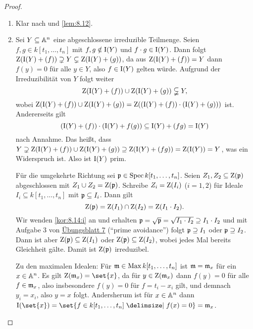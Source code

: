 \documentclass[12pt,a4paper]{scrartcl}
\theoremstyle{cplain}
\theoremstyle{cdef}
\begin{document}
\begin{proof}
	\leavevmode
	\begin{enumerate}[label=\ref{kor:8.14:\roman*}]
		\item Klar nach  und \cref{lem:8.12}.
		\item Sei $Y\subseteq \mathbb A^n$ eine abgeschlossene irreduzible Teilmenge. Seien $f,g\in k[t_1,\dots, t_n]$ mit $f,g\notin \operatorname{I}(Y)$ und $f\cdot g \in \operatorname{I}(Y)$. Dann folgt $\operatorname{Z}(\operatorname{I}(Y)+(f))\supsetneq Y \subsetneq \operatorname{Z}(\operatorname{I}(Y)+(g))$, da aus $\operatorname{Z}(\operatorname{I}(Y)+(f)) = Y$ dann $f(y) = 0$ für alle $y \in Y$, also $f\in \operatorname{I}(Y)$ gelten würde. Aufgrund der Irreduzibilität von $Y$ folgt weiter
		\[\operatorname{Z}(\operatorname{I}(Y)+(f)) \cup \operatorname{Z}(\operatorname{I}(Y)+(g)) \subsetneqq Y,\]
		wobei $\operatorname{Z}(\operatorname{I}(Y)+(f))\cup \operatorname{Z}(\operatorname{I}(Y)+(g)) = \operatorname{Z}((\operatorname{I}(Y)+(f))\cdot (\operatorname{I}(Y)+(g)))$ ist. Andererseits gilt
		\[(\operatorname{I}(Y)+(f))\cdot (\operatorname{I}(Y)+f(g))\subseteq \operatorname{I}(Y)+(fg)= \operatorname{I}(Y)\]
		nach Annahme. Das heißt, dass $Y\supsetneq \operatorname{Z}(\operatorname{I}(Y)+(f))\cup \operatorname{Z}(\operatorname{I}(Y)+(g))\supseteq \operatorname{Z}(\operatorname{I}(Y)+(fg)) = \operatorname{Z}(\operatorname{I}(Y)) = Y$, was ein Widerspruch ist. Also ist $\operatorname{I}(Y)$ prim.
		
		Für die umgekehrte Richtung sei $\mathfrak{p} \in \operatorname{Spec} k[t_1,\dots, t_n]$. Seien $Z_1,Z_2\subseteq \operatorname{Z}(\mathfrak{p})$ abgeschlossen mit $Z_1\cup Z_2 = \operatorname{Z}(\mathfrak{p})$. Schreibe $Z_i = \operatorname{Z}(I_i)$ ($i= 1,2$) für Ideale $I_i\subseteq k[t_1,\dots, t_n]$ mit $\mathfrak{p}\subseteq I_i$. Dann gilt
		\[\operatorname{Z}(\mathfrak{p}) = \operatorname{Z}(I_1)\cap \operatorname{Z}(I_2) = \operatorname{Z}(I_1\cdot I_2).\]
		Wir wenden \ref{kor:8.14:i} an und erhalten $\mathfrak{p} = \sqrt{\mathfrak{p}} = \sqrt{I_1\cdot I_2}\supseteq I_1\cdot I_2$ und mit Aufgabe 3 von \href{http://www.math.uni-bonn.de/ag/stroppel/Franzen_Algebra_1_Uebung/Blatt7b.pdf}{Übungsblatt 7} (\enquote{prime avoidance}) folgt $\mathfrak{p} \supseteq I_1$ oder $\mathfrak{p}\supseteq I_2$. Dann ist aber $\operatorname{Z}(\mathfrak{p}) \subseteq \operatorname{Z}(I_1)$ oder $\operatorname{Z}(\mathfrak{p})\subseteq \operatorname{Z}(I_2)$, wobei jedes Mal bereits Gleichheit gälte. Damit ist $\operatorname{Z}(\mathfrak{p})$ irreduzibel.
		
		Zu den maximalen Idealen: Für $\mathfrak{m}\in\operatorname{Max} k[t_1,\dots, t_n]$ ist $\mathfrak{m} = \mathfrak{m}_x$ für ein $x\in\mathbb A^n$. Es gilt $\Z(\fm_x) = \set{x}$, da für $y\in \operatorname{Z}(\mathfrak{m}_x)$ dann $f(y) = 0$ für alle $f\in \mathfrak{m}_x$, also insbesondere $f(y) = 0$ für $f = t_i-x_i$ gilt, und demnach $y_i = x_i$, also $y = x$ folgt. Andersherum ist für $x\in\mathbb A^n$ dann $\I(\set{x}) = \set{f\in k[t_1,\dots, t_n]\given f(x) = 0} = \fm_x$.
		\qedhere
	\end{enumerate}	
\end{proof}
\end{document}
